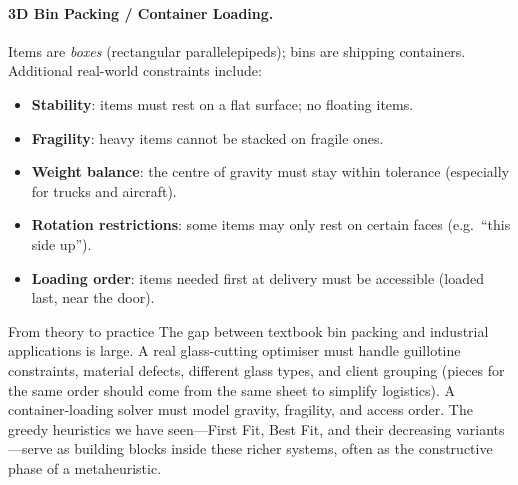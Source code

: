 \paragraph{3D Bin Packing / Container Loading.}
Items are \emph{boxes} (rectangular parallelepipeds); bins are
shipping containers.  Additional real-world constraints include:
\begin{itemize}[nosep]
  \item \textbf{Stability}: items must rest on a flat surface;
        no floating items.
  \item \textbf{Fragility}: heavy items cannot be stacked on
        fragile ones.
  \item \textbf{Weight balance}: the centre of gravity must stay
        within tolerance (especially for trucks and aircraft).
  \item \textbf{Rotation restrictions}: some items may only rest
        on certain faces (e.g.\ ``this side up'').
  \item \textbf{Loading order}: items needed first at delivery
        must be accessible (loaded last, near the door).
\end{itemize}

\begin{intermezzo}{From theory to practice}
The gap between textbook bin packing and industrial applications
is large.  A real glass-cutting optimiser must handle guillotine
constraints, material defects, different glass types, and client
grouping (pieces for the same order should come from the same
sheet to simplify logistics).  A container-loading solver must
model gravity, fragility, and access order.  The greedy
heuristics we have seen---First Fit, Best Fit, and their
decreasing variants---serve as building blocks inside these
richer systems, often as the constructive phase of a
metaheuristic.
\end{intermezzo}
